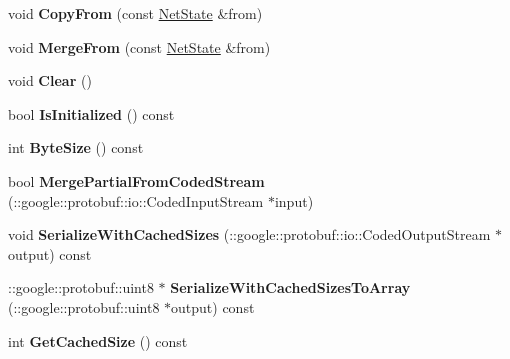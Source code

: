 \begin{DoxyCompactItemize}
\item 
\mbox{\label{classcaffe_1_1_net_state_a8d9e54f93e634f897335685226e41d4e}} 
void {\bfseries Copy\+From} (const \mbox{\hyperlink{classcaffe_1_1_net_state}{Net\+State}} \&from)
\item 
\mbox{\label{classcaffe_1_1_net_state_aab56e0620316a07a62771c70161c9bad}} 
void {\bfseries Merge\+From} (const \mbox{\hyperlink{classcaffe_1_1_net_state}{Net\+State}} \&from)
\item 
\mbox{\label{classcaffe_1_1_net_state_a3c3c7c3e057a99ae94e6c6da0c5b9990}} 
void {\bfseries Clear} ()
\item 
\mbox{\label{classcaffe_1_1_net_state_a3767aa4090a5825ca3d8cc2eda7346a8}} 
bool {\bfseries Is\+Initialized} () const
\item 
\mbox{\label{classcaffe_1_1_net_state_aa23855a83b11c6e89faf6d656062f6ea}} 
int {\bfseries Byte\+Size} () const
\item 
\mbox{\label{classcaffe_1_1_net_state_ab4bcdfa84b50d0101e1ca4b9343d01d4}} 
bool {\bfseries Merge\+Partial\+From\+Coded\+Stream} (\+::google\+::protobuf\+::io\+::\+Coded\+Input\+Stream $\ast$input)
\item 
\mbox{\label{classcaffe_1_1_net_state_a8c3b31bf5de5c46ab2965506daf74e6e}} 
void {\bfseries Serialize\+With\+Cached\+Sizes} (\+::google\+::protobuf\+::io\+::\+Coded\+Output\+Stream $\ast$output) const
\item 
\mbox{\label{classcaffe_1_1_net_state_ad3d1bebe341e45811add855ef48e5889}} 
\+::google\+::protobuf\+::uint8 $\ast$ {\bfseries Serialize\+With\+Cached\+Sizes\+To\+Array} (\+::google\+::protobuf\+::uint8 $\ast$output) const
\item 
\mbox{\label{classcaffe_1_1_net_state_a7196ffae014e07acf336d6c317cb25eb}} 
int {\bfseries Get\+Cached\+Size} () const
\item 
\mbox{\label{classcaffe_1_1_net_state_a222049823e3ae416e1bc7a4d0d44d998}} 

\end{DoxyCompactItemize}
